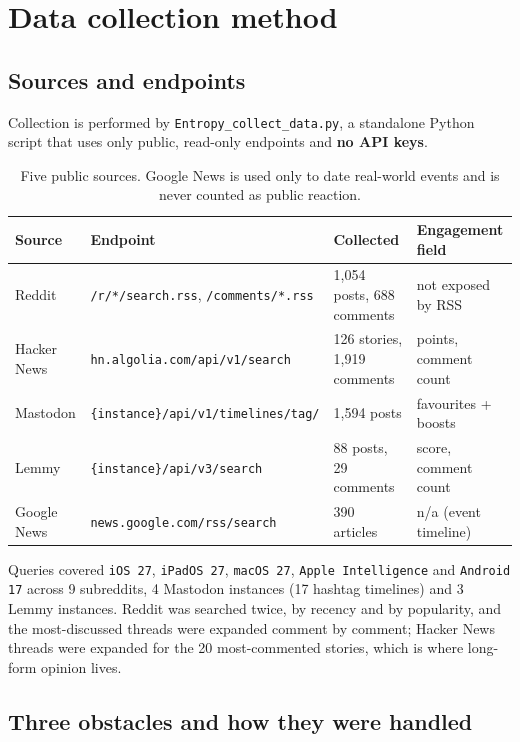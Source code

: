 \documentclass[11pt,a4paper]{article}
\begin{document}
\section{Data collection method}

\subsection{Sources and endpoints}

Collection is performed by \texttt{Entropy\_collect\_data.py}, a standalone Python script that uses only public, read-only endpoints and \textbf{no API keys}.

\begin{table}[H]
\centering\footnotesize
\begin{tabular}{@{}llll@{}}
\toprule
\textbf{Source} & \textbf{Endpoint} & \textbf{Collected} & \textbf{Engagement field} \\
\midrule
Reddit & \texttt{/r/*/search.rss}, \texttt{/comments/*.rss} & 1,054 posts, 688 comments & not exposed by RSS \\
Hacker News & \texttt{hn.algolia.com/api/v1/search} & 126 stories, 1,919 comments & points, comment count \\
Mastodon & \texttt{\{instance\}/api/v1/timelines/tag/} & 1,594 posts & favourites + boosts \\
Lemmy & \texttt{\{instance\}/api/v3/search} & 88 posts, 29 comments & score, comment count \\
Google News & \texttt{news.google.com/rss/search} & 390 articles & n/a (event timeline) \\
\bottomrule
\end{tabular}
\caption{Five public sources. Google News is used only to date real-world events and is never counted as public reaction.}
\end{table}

Queries covered \texttt{iOS 27}, \texttt{iPadOS 27}, \texttt{macOS 27}, \texttt{Apple Intelligence} and \texttt{Android 17} across 9 subreddits, 4 Mastodon instances (17 hashtag timelines) and 3 Lemmy instances. Reddit was searched twice, by recency and by popularity, and the most-discussed threads were expanded comment by comment; Hacker News threads were expanded for the 20 most-commented stories, which is where long-form opinion lives.

\subsection{Three obstacles and how they were handled}
\end{document}
